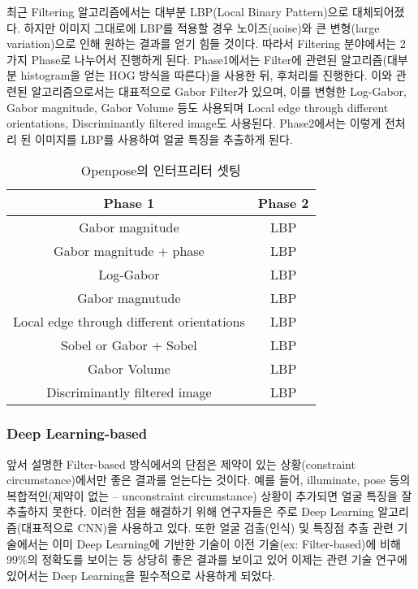 \documentclass{oblivoir}
\begin{document}
 최근 Filtering 알고리즘에서는 대부분 LBP(Local Binary Pattern)으로 대체되어졌다. 하지만 이미지 그대로에 LBP를 적용할 경우 노이즈(noise)와 큰 변형(large variation)으로 인해 원하는 결과를 얻기 힘들 것이다. 따라서 Filtering 분야에서는 2가지 Phase로 나누어서 진행하게 된다. Phase1에서는 Filter에 관련된 알고리즘(대부분 histogram을 얻는 HOG 방식을 따른다)을 사용한 뒤, 후처리를 진행한다. 이와 관련된 알고리즘으로서는 대표적으로 Gabor Filter가 있으며, 이를 변형한 Log-Gabor, Gabor magnitude, Gabor Volume 등도 사용되며 Local edge through different orientations, Discriminantly filtered image도 사용된다. Phase2에서는 이렇게 전처리 된 이미지를 LBP를 사용하여 얼굴 특징을 추출하게 된다.

 \begin{table}[h!]
    \centering
        \begin{tabular}{|c|c|}
            \hline
            \rowcolor{lightgray} Phase 1 & Phase 2 \\ \hline
            Gabor magnitude & LBP \\ \hline
            Gabor magnitude + phase  & LBP \\ \hline
            Log-Gabor &  LBP \\ \hline
            Gabor magnutude  & LBP \\ \hline
            Local edge through different orientations &  LBP \\ \hline
            Sobel or Gabor + Sobel & LBP \\ \hline 
            Gabor Volume  & LBP \\ \hline
            Discriminantly filtered image & LBP \\ \hline
            \hline
        \end{tabular}
	\caption{Openpose의 인터프리터 셋팅 }
\end{table}

\subsubsection{ Deep Learning-based}

앞서 설명한 Filter-based 방식에서의 단점은 제약이 있는 상황(constraint circumstance)에서만 좋은 결과를 얻는다는 것이다. 예를 들어, illuminate, pose 등의 복합적인(제약이 없는 – unconstraint circumstance) 상황이 추가되면 얼굴 특징을 잘 추출하지 못한다. 이러한 점을 해결하기 위해 연구자들은 주로 Deep Learning 알고리즘(대표적으로 CNN)을 사용하고 있다. 또한 얼굴 검출(인식) 및 특징점 추출 관련 기술에서는 이미 Deep Learning에 기반한 기술이 이전 기술(ex: Filter-based)에 비해 99\%의 정확도를 보이는 등 상당히 좋은 결과를 보이고 있어 이제는 관련 기술 연구에 있어서는 Deep Learning을 필수적으로 사용하게 되었다.
\end{document}

